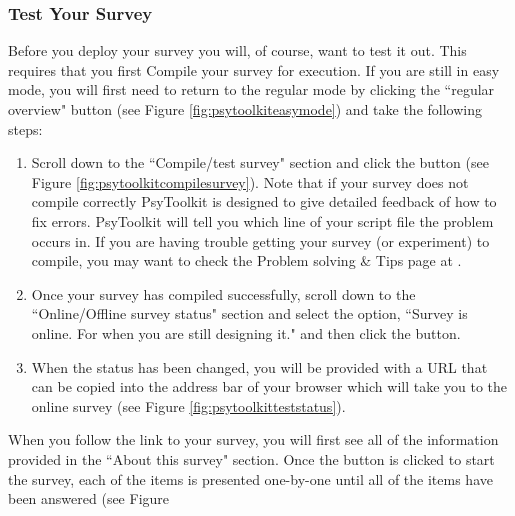 \subsubsection{Test Your Survey}
Before you deploy your survey you will, of course, want to test it out.  This requires that you first \gls{Compile} your survey for execution. If you are still in easy mode, you will first need to return to the regular mode by clicking the ``regular overview" button (see Figure \ref{fig:psytoolkiteasymode}) and take the following steps:

\begin{enumerate}
    \item Scroll down to the ``Compile/test survey" section and click the  button (see Figure \ref{fig:psytoolkitcompilesurvey}).
Note that if your survey does not compile correctly PsyToolkit is designed to give detailed feedback of how to fix errors. PsyToolkit will tell you which line of your script file the problem occurs in.  If you are having trouble getting your survey (or experiment) to compile, you may want to check the Problem solving \& Tips page at .

\item Once your survey has compiled successfully, scroll down to the ``Online/Offline survey status" section and select the option, ``Survey is online. For when you are still designing it." and then click the  button.

\item When the status has been changed, you will be provided with a \gls{URL} that can be copied into the address bar of your browser which will take you to the online survey (see Figure \ref{fig:psytoolkitteststatus}).
\end{enumerate}

When you follow the link to your survey, you will first see all of the information provided in the ``About this survey" section.  Once the button is clicked to start the survey, each of the items is presented one-by-one until all of the items have been answered (see Figure 

